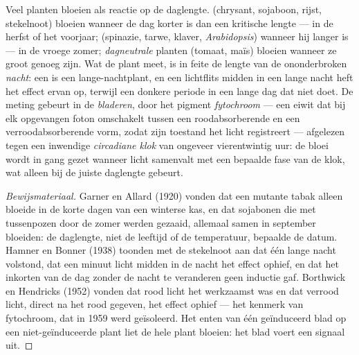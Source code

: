 \begin{proposition}\label{prop:b2:plant-flowering:photoperiod}
Veel planten bloeien als reactie op de daglengte. \emph{}
(chrysant, sojaboon, rijst, stekelnoot) bloeien wanneer de dag korter is dan
een kritische lengte --- in de herfst of het voorjaar;
\emph{} (spinazie, tarwe, klaver, \emph{Arabidopsis})
wanneer hij langer is --- in de vroege zomer; \emph{dagneutrale} planten
(tomaat, maïs) bloeien wanneer ze groot genoeg zijn. Wat de plant meet, is
in feite de lengte van de ononderbroken \emph{nacht}: een  is
een lange-nachtplant, en een lichtflits midden in een lange nacht heft het
effect ervan op, terwijl een donkere periode in een lange dag dat niet
doet. De meting gebeurt in de \emph{bladeren}, door het pigment
\emph{fytochroom} --- een eiwit dat bij elk opgevangen foton omschakelt
tussen een roodabsorberende en een verroodabsorberende vorm, zodat zijn
toestand het licht registreert --- afgelezen tegen een inwendige
\emph{circadiane klok} van ongeveer vierentwintig uur: de bloei wordt in
gang gezet wanneer licht samenvalt met een bepaalde fase van de klok, wat
alleen bij de juiste daglengte gebeurt.
\end{proposition}
\begin{proof}[Bewijsmateriaal]
Garner en Allard (1920) vonden dat een mutante tabak alleen bloeide in de
korte dagen van een winterse kas, en dat sojabonen die met tussenpozen
door de zomer werden gezaaid, allemaal samen in september bloeiden: de
daglengte, niet de leeftijd of de temperatuur, bepaalde de datum. Hamner en
Bonner (1938) toonden met de stekelnoot aan dat één lange nacht volstond,
dat een minuut licht midden in de nacht het effect ophief, en dat het
inkorten van de dag zonder de nacht te veranderen geen inductie gaf.
Borthwick en Hendricks (1952) vonden dat rood licht het werkzaamst was en
dat verrood licht, direct na het rood gegeven, het effect ophief --- het
kenmerk van fytochroom, dat in 1959 werd geïsoleerd. Het enten van één
geïnduceerd blad op een niet-geïnduceerde plant liet de hele plant bloeien:
het blad voert een signaal uit.
\end{proof}

